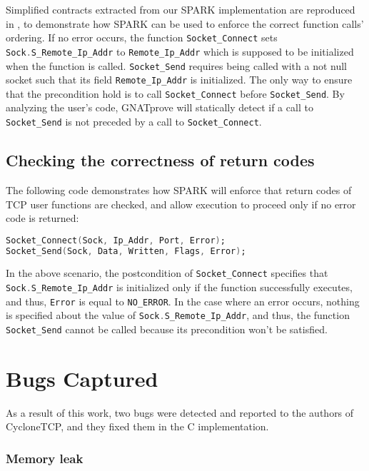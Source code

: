 \documentclass[conference]{IEEEtran}
\def\spark#1{\lstinline[language=Ada]{#1}}
\begin{document}
Simplified contracts extracted from our SPARK implementation are reproduced in , to demonstrate how SPARK can be used to enforce the correct function calls' ordering. If no error occurs, the function \spark{Socket_Connect} sets \spark{Sock.S_Remote_Ip_Addr} to \spark{Remote_Ip_Addr} which is supposed to be initialized when the function is called. \spark{Socket_Send} requires being called with a not null socket such that its field \spark{Remote_Ip_Addr} is initialized. The only way to ensure that the precondition hold is to call \spark{Socket_Connect} before \spark{Socket_Send}. By analyzing the user's code, GNATprove will statically detect if a call to \spark{Socket_Send} is not preceded by a call to \spark{Socket_Connect}.

\subsection{Checking the correctness of return codes}

The following code demonstrates how SPARK will enforce that return codes of TCP user functions are checked, and allow execution to proceed only if no error code is returned:

\begin{lstlisting}[language=Ada,basicstyle=\small\ttfamily]
Socket_Connect(Sock, Ip_Addr, Port, Error);
Socket_Send(Sock, Data, Written, Flags, Error);
\end{lstlisting}

In the above scenario, the postcondition of \spark{Socket_Connect} specifies that \spark{Sock.S_Remote_Ip_Addr} is initialized only if the function successfully executes, and thus, \spark{Error} is equal to \spark{NO_ERROR}. In the case where an error occurs, nothing is specified about the value of \spark{Sock.S_Remote_Ip_Addr}, and thus, the function \spark{Socket_Send} cannot be called because its precondition won't be satisfied.

\section{Bugs Captured}
\label{sec:results}

As a result of this work, two bugs were detected and reported to the authors of
CycloneTCP, and they fixed them in the C implementation.

\label{sec:memory-leak}
\subsubsection{Memory leak}
\end{document}
